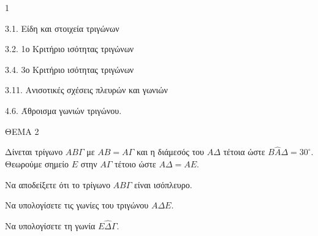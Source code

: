 \begin{ylh}{1}
    \item 3.1. Είδη και στοιχεία τριγώνων
    \item 3.2. 1ο Κριτήριο ισότητας τριγώνων
    \item 3.4. 3ο Κριτήριο ισότητας τριγώνων
    \item 3.11. Ανισοτικές σχέσεις πλευρών και γωνιών
    \item 4.6. Άθροισμα γωνιών τριγώνου.
\end{ylh}

ΘΕΜΑ 2

Δίνεται τρίγωνο $AB\Gamma$ με $AB = A\Gamma$ και η διάμεσός του $A\Delta$ τέτοια ώστε $B\widehat{A}\Delta = 30^{\circ}$. Θεωρούμε σημείο $E$ στην $A\Gamma$ τέτοιο ώστε $A\Delta = AE$.

\begin{alist}
\item Να αποδείξετε ότι το τρίγωνο $AB\Gamma$ είναι ισόπλευρο. 
\item Να υπολογίσετε τις γωνίες του τριγώνου $A\Delta E$. 
\item Να υπολογίσετε τη γωνία $E\widehat{\Delta}\Gamma$. 

\begin{center}
\end{center}
\end{alist}
